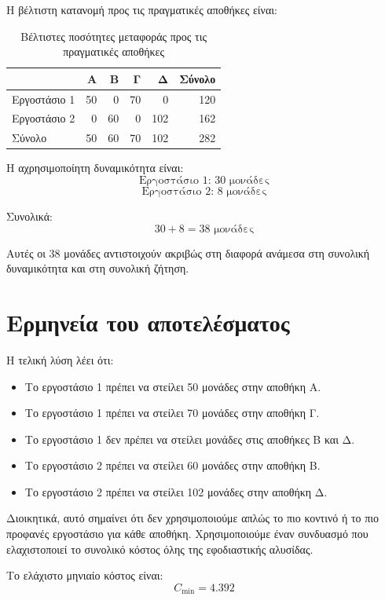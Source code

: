\documentclass[12pt,a4paper]{article}
\begin{document}
Η βέλτιστη κατανομή προς τις πραγματικές αποθήκες είναι:

\begin{table}[H]
\centering
\caption{Βέλτιστες ποσότητες μεταφοράς προς τις πραγματικές αποθήκες}
\small
\begin{tabular}{lrrrrr}
\toprule
 & \textbf{Α} & \textbf{Β} & \textbf{Γ} & \textbf{Δ} & \textbf{Σύνολο} \\
\midrule
Εργοστάσιο 1 & 50 & 0 & 70 & 0 & 120 \\
Εργοστάσιο 2 & 0 & 60 & 0 & 102 & 162 \\
\midrule
Σύνολο & 50 & 60 & 70 & 102 & 282 \\
\bottomrule
\end{tabular}
\end{table}

Η αχρησιμοποίητη δυναμικότητα είναι:
\[
\text{Εργοστάσιο 1: }30 \text{ μονάδες}
\]
\[
\text{Εργοστάσιο 2: }8 \text{ μονάδες}
\]

Συνολικά:
\[
30+8=38 \text{ μονάδες}
\]

Αυτές οι 38 μονάδες αντιστοιχούν ακριβώς στη διαφορά ανάμεσα στη συνολική δυναμικότητα και στη συνολική ζήτηση.

\section{Ερμηνεία του αποτελέσματος}

Η τελική λύση λέει ότι:

\begin{itemize}
    \item Το εργοστάσιο 1 πρέπει να στείλει 50 μονάδες στην αποθήκη Α.
    \item Το εργοστάσιο 1 πρέπει να στείλει 70 μονάδες στην αποθήκη Γ.
    \item Το εργοστάσιο 1 δεν πρέπει να στείλει μονάδες στις αποθήκες Β και Δ.
    \item Το εργοστάσιο 2 πρέπει να στείλει 60 μονάδες στην αποθήκη Β.
    \item Το εργοστάσιο 2 πρέπει να στείλει 102 μονάδες στην αποθήκη Δ.
\end{itemize}

Διοικητικά, αυτό σημαίνει ότι δεν χρησιμοποιούμε απλώς το πιο κοντινό ή το πιο προφανές εργοστάσιο για κάθε αποθήκη. Χρησιμοποιούμε έναν συνδυασμό που ελαχιστοποιεί το συνολικό κόστος όλης της εφοδιαστικής αλυσίδας.

Το ελάχιστο μηνιαίο κόστος είναι:
\[
\boxed{C_{\min}=4.392}
\]
\end{document}
